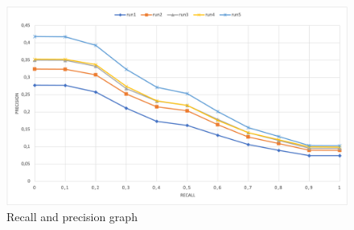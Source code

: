 \begin{figure}[h!]
    \includegraphics[width=\textwidth]{figure/rp_french.png}
    \caption{Recall and precision graph}
    \label{fig:rp_french}
\end{figure}